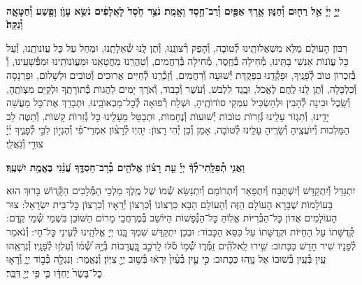 \documentclass[twoside, openany, parskip=half, 11pt]{book}
\begin{document}
\begin{sometimes}

\\
 \textbf{יְיָ֣ יְיָ֔ אֵ֥ל רַח֖וּם וְ֯חַנּ֑וּן אֶ֥רֶךְ אַפַּ֖יִם וְ֯רַב־חֶ֥סֶד וֶאֱמֶֽת׃ נֹצֵ֥ר חֶ֙סֶד֙ לָאֲלָפִ֔ים נֹשֵׂ֥א עָוֺ֛ן וָפֶ֖שַׁע וְ֯חַטָּאָ֑ה וְ֯נַקֵּה֙׃}

רִבּוֺן הָעוׂלָם מַלֵּא מִשְׁאֲלוׂתֵֽינוּ לְ֯טוׂבָה, וְ֯הָפֵק רְ֯צוׂנֵֽנוּ, וְ֯תֶן לָֽנוּ שְׁ֯אֵלָתֵֽנוּ, וּמְחַל עַל כָּל עֲוׂנוׂתֵֽנוּ, וְ֯עַל כָּל עֲוׂנוׂת אַנְשֵׁי בָתֵּֽינוּ, מְ֯חִילָה בְּ֯חֶֽסֶד, מְ֯חִילָה בְּ֯רַחֲמִים, וְ֯טַהֲרֵֽנוּ מֵחֲטָאֵֽנוּ וּמֵעֲוׂנוׂתֵֽינוּ וּמִפְּ֯שָׁעֵֽינוּ, וְ֯ בְּ֯זִכְרוׂן טוׂב לְ֯פָנֶֽיךָ, וּפָקְ֯דֵֽנוּ בִּפְקֻדַּת יְ֯שׁוּעָה וְ֯רַחֲמִים, וְ֯זָכְ֯רֵֽנוּ לְ֯חַיִּים אֲרוּכִים וְ֯טוׂבִים וּלְשָׁלוׂם, וּפַרְנָסָה וְ֯כַלְכָּלָה, וְ֯תֶן לָֽנוּ לֶֽחֶם לֶאֱכׂל, וּבֶֽגֶד לִלְבּׂשׁ, וְ֯עׂשֶׁר וְ֯כָבוׂד, וְ֯אׂרֶךְ יָמִים לַהֲגוׂת בְּ֯תוׂרָתֶֽךָ וּלְקַיֵּם מִצְוׂתֶֽהָ, וְ֯שֵֽׂכֶל וּבִינָה לְ֯הָבִין וּלְהַשְׂכִּיל עִמְקֵי סוׂדוׂתֶֽיהָ, וּשְׁלַח רְ֯פוּאָה לְ֯כׇל־מַכְאוׂבֵֽינוּ, וּתְבָרֵךְ אֶת־כָּל מַעֲשֵׁה יָדֵֽינוּ, וְ֯תִגְזׂר עָלֵֽינוּ גְּ֯זֵרוׂת טוׂבוׂת יְ֯שׁוּעוׂת וְ֯נֶחָמוׂת, וּתְבַטֵּל מֵעָלֵֽינוּ כָּל גְּ֯זֵרוׂת קָשׁוׂת, וְ֯תַטֶּה לֵב הַמַּלְכוּת וְ֯יוׂעֲצֶֽיהָ וְ֯שָׂרֶֽיהָ עָלֵֽינוּ לְ֯טוׂבָה, אָמֵן וְ֯כֵן יְ֯הִי רָצוׂן:
%
יִ֥הְיֽוּ לְ֯רָצ֨וֹן אִמְרֵי־פִ֡י וְ֯הֶגְי֣וֹן לִבִּ֣י לְ֯פָנֶ֑יךָ יְ֜יָ֗ צוּרִ֥י וְ֯גֹֽאֲלִֽי׃


\textbf{וַאֲנִ֤י תְ֯פִלָּֽתִי־לְ֯ךָ֨ יְיָ֡ עֵ֤ת רָצ֗וֹן אֱלֹהִ֥ים בְּ֯רָב־חַסְדֶּ֑ךָ עֲ֝נֵ֗נִי בֶּאֱמֶ֥ת יִשְׁעֶֽךָ׃}

\end{sometimes}

\gadlu

\label{al hakol}
יִתְגַּדַּל וְ֯יִתְקַדַּשׁ וְ֯יִשְׁתַּבַּח וְ֯יִתְפָּאַר וְ֯יִתְרוֹמַם וְ֯יִתְנַשֵּׂא שְׁ֯מוֹ שֶׁל מֶֽלֶךְ מַלְכֵי הַמְּ֯לָכִים הַקְָּ֯דוֹשׁ בָּרוּךְ הוּא בָּעוֹלָמוֹת שֶׁבָּרָא הָעוֹלָם הַזֶּה וְ֯הָעוֹלָם הַבָּא כִּרְצוֹנוֹ וְ֯כִרְצוֹן יְ֯רֵאָיו וְ֯כִרְצוֹן כׇּל־בֵּית יִשְׂרָאֵל: צוּר הָעוֹלָמִים אֲדוֹן כׇּל־הַבְּ֯רִיּוֹת אֱלֽוֹהַּ כׇּל־הַנְּ֯פָשׁוֹת הַיּוֹשֵׁב בְּ֯מֶרְחֲבֵי מָרוֹם הַשּׁוֹכֵן בִּשְׁמֵי שְׁ֯מֵי קֶֽדֶם: קְ֯דֻשָּׁתוֹ עַל הַחַיּוֹת וּקְדֻשָּׁתוֹ עַל כִּסֵּא הַכָּבוֹד: וּבְכֵן יִתְקַדַּשׁ שִׁמְךָ בָּֽנוּ יְיָ אֱלֹהֵֽינוּ לְ֯עֵינֵי כׇּל־חָי: וְ֯נֹאמַר לְ֯פָנָיו שִׁיר חָדָשׁ כַּכָּתוּב:
שִׁ֥ירוּ לֵֽאלֹהִֽ֘ים זַמְּ֯ר֢וּ שְׁ֯֫מ֥וֹ סֹ֡לּוּ לָֽרֹכֵ֣ב בָּֽ֭עֲרָבוֹת בְּ֯יָ֥הּ שְׁ֯֝מ֗וֹ וְ֯עִלְז֥וּ לְ֯פָנָֽיו׃ וְ֯נִרְאֵֽהוּ עַֽיִן בְּ֯עַֽיִן בְּ֯שׁוּבוֹ אֶל נָוֵֽהוּ כַּכָּתוּב:
%
כִּ֣י עַ֤יִן בְּ֯עַ֨יִן֙ יִרְא֔וּ בְּ֯שׁ֥וּב יְיָ֖ צִיּֽוֹן׃ וְ֯נֶאֱמַר:
וְנִגְלָ֖ה כְּ֯ב֣וֹד יְיָ֑ וְ֯רָא֤וּ כׇל־בָּשָׂר֙ יַחְדָּ֔ו כִּ֛י פִּ֥י יְיָ֖ דִּבֵּֽר׃
\end{document}
